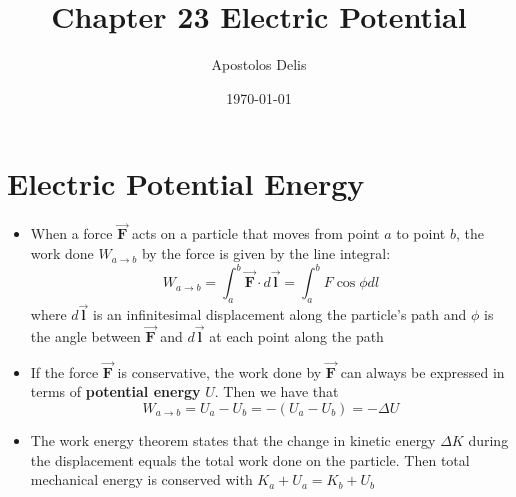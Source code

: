 \documentclass[11pt, a4paper]{article}
\begin{document}
\title{Chapter 23 Electric Potential}
\author{Apostolos Delis}
\date{\today}
\maketitle

\tableofcontents
\section[23.1, Electric Potential Energy]{Electric Potential Energy}
\begin{itemize}
    \item When a force $\vec{\mathbf{F}}$ acts on a particle that moves from point $a$ to
        point $b$, the work done $W_{a\rightarrow b}$ by the force is given by the line
        integral:
        \begin{equation}
            W_{a\rightarrow b} = \int_a^b \vec{\mathbf{F}} \cdot d \vec{\mathbf{l}} =
            \int_a^b F\cos\phi dl
        \end{equation}
        where $d \vec{\mathbf{l}}$ is an infinitesimal displacement along the particle's
        path and $\phi$ is the angle between $\vec{\mathbf{F}}$ and $d \vec{\mathbf{l}}$
        at each point along the path
    \item If the force $\vec{\mathbf{F}}$ is conservative, the work done by
        $\vec{\mathbf{F}}$ can always be expressed in terms of \textbf{potential energy}
        $U$. Then we have that
        \begin{equation}
            W_{a\rightarrow b} = U_a - U_b = -(U_a - U_b) = -\Delta U
        \end{equation}
    \item The work energy theorem states that the change in kinetic energy $\Delta K$
        during the displacement equals the total work done on the particle. Then total
        mechanical energy is conserved with $K_a + U_a = K_b + U_b$
\end{itemize}
\end{document}
